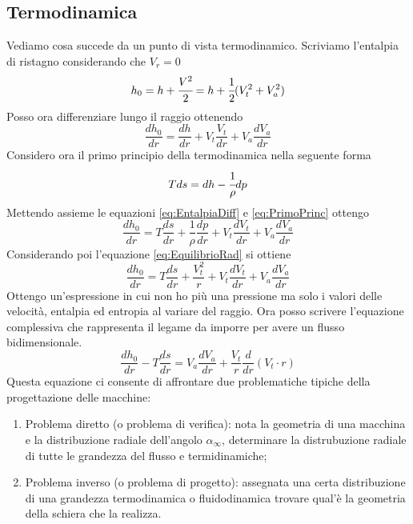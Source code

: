 \subsection{Termodinamica}
Vediamo cosa succede da un punto di vista termodinamico.
Scriviamo l'entalpia di ristagno considerando che $V_r = 0$
\begin{equation}
h_0 = h + \cfrac{V^2}{2} = h + \cfrac{1}{2}(V_t^2 + V_a^2)
\end{equation}
Posso ora differenziare lungo il raggio ottenendo
\begin{equation}
\frac{dh_0}{dr} = \frac{dh}{dr} + V_t \frac{V_t}{dr} + V_a \frac{dV_a}{dr}
\label{eq:EntalpiaDiff}
\end{equation}
Considero ora il primo principio della termodinamica nella seguente forma
\begin{equation}
Tds = dh - \cfrac{1}{\rho} dp
\label{eq:PrimoPrinc}
\end{equation}
Mettendo assieme le equazioni \ref{eq:EntalpiaDiff} e \ref{eq:PrimoPrinc} ottengo
\begin{equation}
\frac{dh_0}{dr} = T \frac{ds}{dr} + \frac{1}{\rho} \frac{dp}{dr} + V_t \frac{dV_t}{dr} + V_a \frac{dV_a}{dr}
\end{equation}
Considerando poi l'equazione \ref{eq:EquilibrioRad} si ottiene
\begin{equation}
\frac{dh_0}{dr} = T \frac{ds}{dr} + \frac{V_t^2}{r} + V_t \frac{dV_t}{dr} + V_a \frac{dV_a}{dr}
\end{equation}
Ottengo un'espressione in cui non ho più una pressione ma solo i valori delle velocità, entalpia ed entropia al variare del raggio.
Ora posso scrivere l'equazione complessiva che rappresenta il legame da imporre per avere un flusso bidimensionale.
\begin{equation}
\boxed{ \frac{dh_0}{dr} - T\frac{ds}{dr} = V_a \frac{dV_a}{dr} + \frac{V_t}{r} \frac{d}{dr}(V_t \cdot r)}
\end{equation}
Questa equazione ci consente di affrontare due problematiche tipiche della progettazione delle macchine:
\begin{enumerate}
\item Problema diretto (o problema di verifica): nota la geometria di una macchina e la distribuzione radiale dell'angolo $\alpha_{\infty}$, determinare la distrubuzione radiale di tutte le grandezza del flusso e termidinamiche;
\item Problema inverso (o problema di progetto): assegnata una certa distribuzione di una grandezza termodinamica o fluidodinamica trovare qual'è la geometria della schiera che la realizza.
\end{enumerate}
